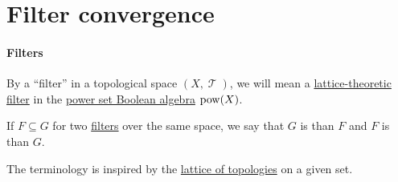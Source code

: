 \section{Filter convergence}\label{sec:filter_convergence}

\paragraph{Filters}

\begin{definition}\label{def:topological_filter}
  By a \enquote{filter} in a topological space \( (X, \mscrT) \), we will mean a \hyperref[def:lattice_ideal]{lattice-theoretic filter} in the \hyperref[thm:boolean_algebra_of_subsets]{power set Boolean algebra} \( \operatorname{pow}(X) \).
\end{definition}

\begin{definition}\label{def:filter_ordering}
  If \( F \subseteq G \) for two \hyperref[def:topological_filter]{filters} over the same space, we say that \( G \) is  than \( F \) and \( F \) is  than \( G \).
\end{definition}
\begin{comments}
  \item The terminology is inspired by the \hyperref[def:topological_space_ordering]{lattice of topologies} on a given set.
\end{comments}
